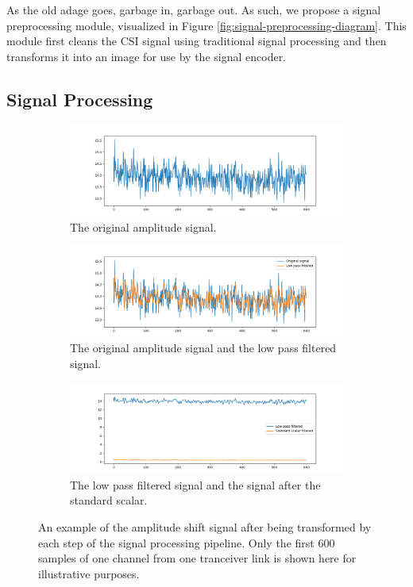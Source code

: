 As the old adage goes, garbage in, garbage out.
As such, we propose a signal preprocessing module, visualized in Figure \ref{fig:signal-preprocessing-diagram}.
This module first cleans the CSI signal using traditional signal processing and then transforms it into an image for use by the signal encoder.

\subsection{Signal Processing}

\begin{figure}
	\centering
	\begin{subfigure}{0.49\textwidth}
		\centering
		\includegraphics[width=\textwidth]{figures/amp_original}
		\caption{The original amplitude signal.}
	\end{subfigure}
	\hfill
	\begin{subfigure}{0.49\textwidth}
		\centering
		\includegraphics[width=\textwidth]{figures/amp_step_1}
		\caption{The original amplitude signal and the low pass filtered signal.}
	\end{subfigure}
	\hfill
	\begin{subfigure}{0.49\textwidth}
		\centering
		\includegraphics[width=\textwidth]{figures/amp_step_2}
		\caption{The low pass filtered signal and the signal after the standard scalar.}
	\end{subfigure}
	\hfill
	\caption{An example of the amplitude shift signal after being transformed by each step of the signal processing pipeline. Only the first 600 samples of one channel from one tranceiver link is shown here for illustrative purposes.} \label{fig:amp-pipeline}
\end{figure}

